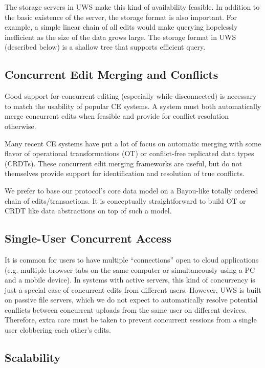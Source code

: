 \documentclass{article}
\begin{document}
The storage servers in UWS make this kind of availability feasible.
In addition to the basic existence of the server, the storage format is also important.
For example, a simple linear chain of all edits would make querying hopelessly inefficient as the size of the data grows large.
The storage format in UWS (described below) is a shallow tree that supports efficient query.

\subsection{Concurrent Edit Merging and Conflicts}

Good support for concurrent editing (especially while disconnected) is necessary to match the usability of popular CE systems.
A system must both automatically merge concurrent edits when feasible and provide for conflict resolution otherwise.

Many recent CE systems have put a lot of focus on automatic merging with some flavor of operational transformations (OT) or conflict-free replicated data types (CRDTs).
These concurrent edit merging frameworks are useful, but do not themselves provide support for identification and resolution of true conflicts.

We prefer to base our protocol's core data model on a Bayou-like totally ordered chain of edits{\slash}transactions.
It is conceptually straightforward to build OT or CRDT like data abstractions on top of such a model.

\subsection{Single-User Concurrent Access}

It is common for users to have multiple ``connections'' open to cloud applications (e.g. multiple browser tabs on the same computer or simultaneously using a PC and a mobile device).
In systems with active servers, this kind of concurrency is just a special case of concurrent edits from different users.
However, UWS is built on passive file servers, which we do not expect to automatically resolve potential conflicts between concurrent uploads from the same user on different devices.
Therefore, extra care must be taken to prevent concurrent sessions from a single user clobbering each other's edits.

\subsection{Scalability}
\end{document}
